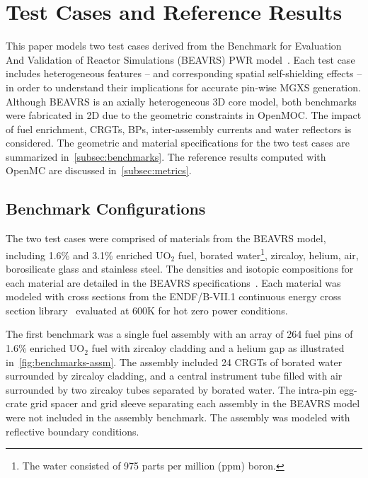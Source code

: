 \section{Test Cases and Reference Results}
\label{sec:test-cases}

This paper models two test cases derived from the Benchmark for Evaluation And Validation of Reactor Simulations (BEAVRS) PWR model~\citep{horelik2013beavrs}. Each test case includes heterogeneous features -- and corresponding spatial self-shielding effects -- in order to understand their implications for accurate pin-wise MGXS generation. Although BEAVRS is an axially heterogeneous 3D core model, both benchmarks were fabricated in 2D due to the geometric constraints in OpenMOC. The impact of fuel enrichment, CRGTs, BPs, inter-assembly currents and water reflectors is considered. The geometric and material specifications for the two test cases are summarized in~\autoref{subsec:benchmarks}. The reference results computed with OpenMC are discussed in~\autoref{subsec:metrics}.


\subsection{Benchmark Configurations}
\label{subsec:benchmarks}

The two test cases were comprised of materials from the BEAVRS model, including 1.6\% and 3.1\% enriched UO$_2$ fuel, borated water\footnote{The water consisted of 975 parts per million (ppm) boron.}, zircaloy, helium, air, borosilicate glass and stainless steel. The densities and isotopic compositions for each material are detailed in the BEAVRS specifications~\citep{horelik2013beavrs}. Each material was modeled with cross sections from the ENDF/B-VII.1 continuous energy cross section library~\citep{mcnpx2003manual} evaluated at 600K for hot zero power conditions.

The first benchmark was a single fuel assembly with an array of 264 fuel pins of 1.6\% enriched UO$_2$ fuel with zircaloy cladding and a helium gap as illustrated in~\autoref{fig:benchmarks-assm}. The assembly included 24 CRGTs of borated water surrounded by zircaloy cladding, and a central instrument tube filled with air surrounded by two zircaloy tubes separated by borated water. The intra-pin egg-crate grid spacer and grid sleeve separating each assembly in the BEAVRS model were not included in the assembly benchmark. The assembly was modeled with reflective boundary conditions.

